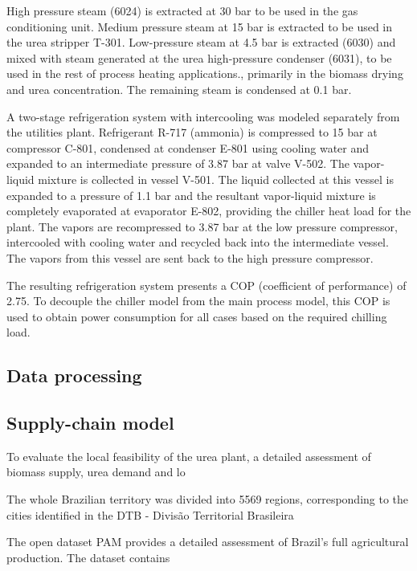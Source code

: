 \documentclass[a4paper, titlepage]{article}
\begin{document}
High pressure steam (6024) is extracted at 30 bar to be used in the gas conditioning unit. Medium pressure steam at 
15 bar is extracted to be used in the urea stripper T-301. Low-pressure steam at 4.5 bar is extracted (6030) and mixed 
with steam generated at the urea high-pressure condenser (6031), to be used in the rest of process heating 
applications., primarily in the biomass drying and urea concentration. The remaining steam is condensed at 0.1 bar.  

A two-stage refrigeration system with intercooling \cite{stoeckerIndustrialRefrigerationHandbook2004} was modeled 
separately from the utilities plant. Refrigerant R-717 (ammonia) is compressed to 15 bar at compressor C-801, 
condensed at condenser E-801 using cooling water and expanded to an intermediate pressure of 3.87 bar at valve V-502. 
The vapor-liquid mixture is collected in vessel V-501. The liquid collected at this vessel is expanded to a pressure
of 1.1 bar and the resultant vapor-liquid mixture is completely evaporated at evaporator E-802, providing the chiller
heat load for the plant. The vapors are recompressed to 3.87 bar at the low pressure compressor, intercooled with 
cooling water and recycled back into the intermediate vessel. The vapors from this vessel are sent back to the 
high pressure compressor.

The resulting refrigeration system presents a COP (coefficient of performance) of 2.75. To decouple the chiller model
from the main process model, this COP is used to obtain power consumption for all cases based on the required chilling
load.

\subsection{Data processing}



\subsection{Supply-chain model}

To evaluate the local feasibility of the urea plant, a detailed assessment of biomass supply, urea demand and lo

The whole Brazilian territory was divided into 5569 regions, corresponding to the cities identified in the DTB - 
Divisão Territorial Brasileira

The open dataset PAM \cite{IBGEPAMProducao} provides a detailed assessment of Brazil's full agricultural production.
The dataset contains 
\end{document}
